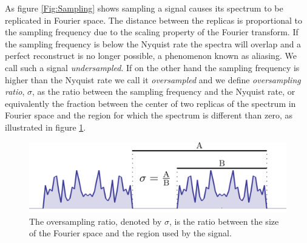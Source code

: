 As figure \ref{Fig:Sampling} shows sampling a signal causes its spectrum to be
replicated in Fourier space. The distance between the replicas is proportional
to the sampling frequency due to the scaling property of the Fourier
transform. If the sampling frequency is below the Nyquist rate the spectra will
overlap and a perfect reconstruct is no longer possible, a phenomenon known as
aliasing. We call such a signal {\em undersampled}. If on the other hand
the sampling frequency is higher than the Nyquist rate we call it {\em
  oversampled} and we define {\em oversampling ratio}, $\sigma$, as the ratio between the
sampling frequency and the Nyquist rate, or equivalently the fraction between
the center of two replicas of the spectrum in Fourier space and the region for
which the spectrum is different than zero, as illustrated in figure \ref{Fig:OversamplingRatio}.

\begin{figure}[h]
  \centering
  \includegraphics[width=0.8 \columnwidth]{Fourier_Theory/Oversampling.png}
 \caption{The oversampling ratio, denoted by $\sigma$, is the ratio between the
    size of the Fourier space and the region used by the signal.}
  \label{Fig:OversamplingRatio}

\end{figure}
